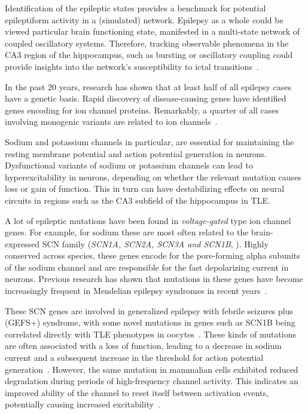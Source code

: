 Identification of the epileptic states provides a benchmark for potential epileptiform activity in a (simulated) network.
Epilepsy as a whole could be viewed particular brain functioning state, manifested in a multi-state network of coupled oscillatory systems.
Therefore, tracking observable phenomena in the CA3 region of the hippocampus, such as bursting or oscillatory coupling could provide insights
into the network's susceptibility to ictal transitions~\parencite{kalitzinEpilepsyManifestationMultistate2019a}.

In the past 20 years, research has shown that at least half of all epilepsy cases have a genetic basis.
Rapid discovery of disease-causing genes have identified genes encoding for ion channel proteins.
Remarkably, a quarter of all cases involving monogenic variants are related to ion channels~\parencite{strianoGeneticTestingPrecision2020,oyrerIonChannelsGenetic2018}.

Sodium and potassium channels in particular, are essential for maintaining the resting
membrane potential and action potential generation in neurons.
Dysfunctional variants of sodium or potassium channels can lead to hyperexcitability in neurons, depending on whether the relevant mutation causes loss or gain of function.
This in turn can have destabilizing effects on neural circuits in regions such as the CA3 subfield of the hippocampus in TLE\@.

A lot of epileptic mutations have been found in \textit{voltage-gated} type ion channel genes.
For example, for sodium these are most often related to the brain-expressed
SCN family (\textit{SCN1A, SCN2A, SCN3A and SCN1B}, \textcite{brunklausSodiumChannelEpilepsies2020}).
Highly conserved across species, these genes encode for the pore-forming alpha subunits of the sodium channel
and are responsible for the fast depolarizing current in neurons. Previous research has shown that mutations in these genes have become
increasingly frequent in Mendelian epilepsy syndromes in recent years~\parencite{brunklausSodiumChannelEpilepsies2020}.

These SCN genes are involved in generalized epilepsy with febrile seizures plus (GEFS+) syndrome, with some novel mutations
in genes such as SCN1B being correlated directly with TLE phenotypes in oocytes~\parencite{schefferTemporalLobeEpilepsy2006}.
These kinds of mutations are often associated with a loss of function, leading to a decrease in sodium current and a subsequent increase
in the threshold for action potential generation~\parencite{wallaceFebrileSeizuresGeneralized1998}.
However, the same mutation in mammalian cells exhibited reduced degradation during periods of high-frequency
channel activity. This indicates an improved ability of the channel to reset itself between activation events, potentially causing increased excitability~\parencite{meadowsFunctionalBiochemicalAnalysis2002}.

